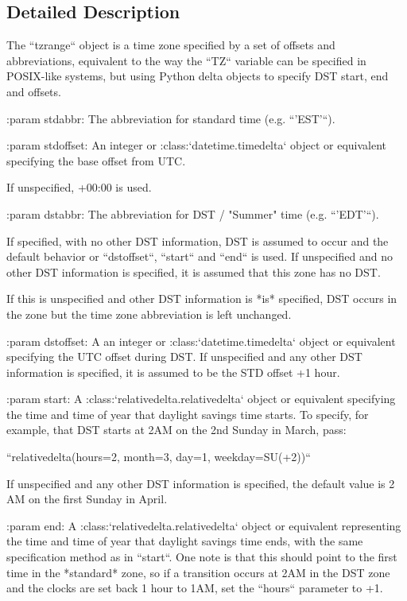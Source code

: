 \subsection{Detailed Description}
\begin{DoxyVerb}The ``tzrange`` object is a time zone specified by a set of offsets and
abbreviations, equivalent to the way the ``TZ`` variable can be specified
in POSIX-like systems, but using Python delta objects to specify DST
start, end and offsets.

:param stdabbr:
    The abbreviation for standard time (e.g. ``'EST'``).

:param stdoffset:
    An integer or :class:`datetime.timedelta` object or equivalent
    specifying the base offset from UTC.

    If unspecified, +00:00 is used.

:param dstabbr:
    The abbreviation for DST / "Summer" time (e.g. ``'EDT'``).

    If specified, with no other DST information, DST is assumed to occur
    and the default behavior or ``dstoffset``, ``start`` and ``end`` is
    used. If unspecified and no other DST information is specified, it
    is assumed that this zone has no DST.

    If this is unspecified and other DST information is *is* specified,
    DST occurs in the zone but the time zone abbreviation is left
    unchanged.

:param dstoffset:
    A an integer or :class:`datetime.timedelta` object or equivalent
    specifying the UTC offset during DST. If unspecified and any other DST
    information is specified, it is assumed to be the STD offset +1 hour.

:param start:
    A :class:`relativedelta.relativedelta` object or equivalent specifying
    the time and time of year that daylight savings time starts. To
    specify, for example, that DST starts at 2AM on the 2nd Sunday in
    March, pass:

        ``relativedelta(hours=2, month=3, day=1, weekday=SU(+2))``

    If unspecified and any other DST information is specified, the default
    value is 2 AM on the first Sunday in April.

:param end:
    A :class:`relativedelta.relativedelta` object or equivalent
    representing the time and time of year that daylight savings time
    ends, with the same specification method as in ``start``. One note is
    that this should point to the first time in the *standard* zone, so if
    a transition occurs at 2AM in the DST zone and the clocks are set back
    1 hour to 1AM, set the ``hours`` parameter to +1.



\end{DoxyVerb}

